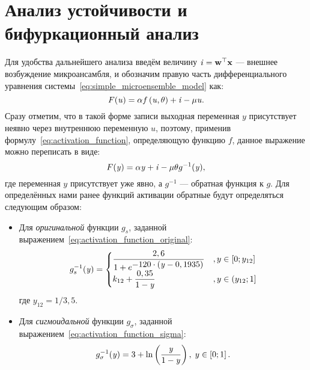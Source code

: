 \section{Анализ устойчивости и бифуркационный анализ} \label{section:neuron_equilibrium}

Для удобства дальнейшего анализа введём величину $\mathit{i} = \mathrm{\mathbf{w}}^{\top} \mathrm{\mathbf{x}}$ --- внешнее возбуждение микроансамбля, и обозначим правую часть дифференциального уравнения системы~\eqref{eq:simple_microensemble_model} как:
\begin{equation}
    \label{eq:functional_u}
    F(\mathit{u}) = \alpha f\left( \mathit{u}, \theta \right) + \mathit{i} - \mu \mathit{u}.
\end{equation}
Сразу отметим, что в такой форме записи выходная переменная $y$ присутствует неявно через внутреннюю переменную $u$, поэтому, применив формулу~\eqref{eq:activation_function}, определяющую функцию $f$, данное выражение можно переписать в виде:
\begin{equation}
    \label{eq:functional_y}
    F(\mathit{y}) = \alpha \mathit{y} + \mathit{i} - \mu \theta g^{-1}(\mathit{y}),
\end{equation}
где переменная $y$ присутствует уже явно, а $g^{-1}$ --- обратная функция к $g$. Для определённых нами ранее функций активации обратные будут определяться следующим образом:
\begin{itemize}
    \item Для \textit{оригинальной} функции $g_{s}$, заданной выражением~\eqref{eq:activation_function_original}:
    \begin{equation}
        \label{eq:unactivation_function_original}
        g_{s}^{-1}(\mathit{y}) = 
        \begin{cases}
            \dfrac{2,6}{1 + e^{\displaystyle -120 \cdot (\mathit{y} - 0,1935)}} &, y \in \left[0; y_{12}\right] \\
            k_{12} + \dfrac{0,35}{1 - \mathit{y}}                               &, y \in \left(y_{12}; 1\right] \\
        \end{cases}
    \end{equation}
    где $y_{12} = 1/3,5$.
    \item Для \textit{сигмоидальной} функции $g_{\sigma}$, заданной выражением~\eqref{eq:activation_function_sigma}:
    \begin{equation}
        \label{eq:unactivation_function_sigma}
        g_{\sigma}^{-1}(\mathit{y}) = 3 + \ln\left(\dfrac{\mathit{y}}{1 - \mathit{y}}\right),\;y \in \left[0; 1\right].
    \end{equation}
\end{itemize}

